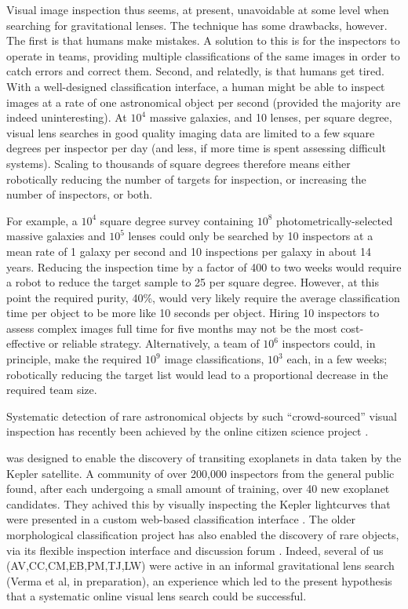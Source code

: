\documentclass[useAMS,usenatbib,a4paper]{mn2e}
\begin{document}
Visual image inspection thus seems, at present, unavoidable at some level when
searching for gravitational lenses. The technique has some drawbacks, however.
The first is that humans make mistakes. A solution to
this is for the inspectors to operate in teams, providing multiple
classifications of the same images in order to catch errors and correct them.
Second, and relatedly, is that humans get tired. With a well-designed
classification interface, a human might be able to inspect images at a rate of
one astronomical object per second (provided the majority are indeed
uninteresting). At $10^4$ massive galaxies, and 10 lenses, per square degree,
visual lens searches in good quality imaging data are limited to a few square
degrees per inspector per day (and less, if more time is spent assessing difficult systems).
Scaling to thousands of square degrees
therefore means either robotically reducing the number of targets for
inspection, or increasing the number of inspectors, or both.

For example, a $10^4$ square degree survey containing $10^8$
photometrically-selected massive galaxies and $10^5$ lenses could only be
searched by 10 inspectors at a mean rate of 1 galaxy per second and 10
inspections per galaxy in about 14 years. Reducing the inspection time by a
factor of 400 to two weeks would require a robot to reduce the target sample
to 25 per square degree. However, at this point the required purity, 40\%,
would very likely require the average classification time per object to be
more like 10 seconds per object. Hiring 10 inspectors to assess complex images
full time for five months may not be the most cost-effective or
reliable strategy. Alternatively, a team of $10^6$ inspectors could, in
principle, make the required $10^9$ image classifications, $10^3$ each, in a
few weeks; robotically reducing the target list would lead to a proportional
decrease in the required team size.

Systematic detection of rare astronomical objects by such ``crowd-sourced''
visual inspection has recently been achieved by the online citizen science
project \PH \citep{SchwambEtal2012}.

\PH was designed to enable the discovery of transiting exoplanets in data taken
by the Kepler satellite. A community of over 200,000 inspectors from the general
public found, after each undergoing a small amount of training, over 40 new
exoplanet candidates. They achived this   by visually inspecting the Kepler
lightcurves that were presented in a custom web-based classification interface
\citep{WangEtal2013}.
The older \GZ morphological classification
project \citep{LintottEtal2008} has also enabled the discovery of rare objects,
via its flexible inspection interface and discussion forum
\citep{LintottEtal2009}. Indeed, several of us (AV,CC,CM,EB,PM,TJ,LW) were
active in an informal \GZ gravitational lens search (Verma et al, in
preparation), an experience which led to the present hypothesis that a
systematic online visual lens search could be successful.
\end{document}
